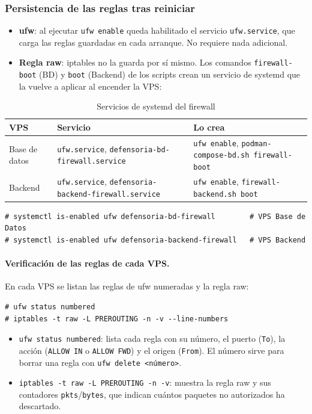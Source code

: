 \subsubsection{Persistencia de las reglas tras reiniciar}
\begin{itemize}
  \item \textbf{ufw}: al ejecutar \texttt{ufw enable} queda habilitado el servicio \texttt{ufw.service}, que carga las reglas guardadas en cada arranque. No requiere nada adicional.
  \item \textbf{Regla raw}: iptables no la guarda por sí mismo. Los comandos \texttt{firewall-boot} (BD) y \texttt{boot} (Backend) de los scripts crean un servicio de systemd que la vuelve a aplicar al encender la VPS:
\end{itemize}
\begin{table}[H]
\centering
\caption{Servicios de systemd del firewall}
\footnotesize
\begin{tabular}{p{2.2cm}p{5.6cm}p{6.4cm}}
\toprule
\textbf{VPS} & \textbf{Servicio} & \textbf{Lo crea} \\
\midrule
Base de datos & \texttt{ufw.service}, \texttt{defensoria-bd-firewall.service} & \texttt{ufw enable}, \texttt{podman-compose-bd.sh firewall-boot} \\
Backend & \texttt{ufw.service}, \texttt{defensoria-backend-firewall.service} & \texttt{ufw enable}, \texttt{firewall-backend.sh boot} \\
\bottomrule
\end{tabular}
\end{table}
\begin{lstlisting}
# systemctl is-enabled ufw defensoria-bd-firewall        # VPS Base de Datos
# systemctl is-enabled ufw defensoria-backend-firewall   # VPS Backend
\end{lstlisting}

\paragraph{Verificación de las reglas de cada VPS.} En cada VPS se listan las reglas de ufw numeradas y la regla raw:
\begin{lstlisting}
# ufw status numbered
# iptables -t raw -L PREROUTING -n -v --line-numbers
\end{lstlisting}
\begin{itemize}
  \item \texttt{ufw status numbered}: lista cada regla con su número, el puerto (\texttt{To}), la acción (\texttt{ALLOW IN} o \texttt{ALLOW FWD}) y el origen (\texttt{From}). El número sirve para borrar una regla con \texttt{ufw delete <número>}.
  \item \texttt{iptables -t raw -L PREROUTING -n -v}: muestra la regla raw y sus contadores \texttt{pkts}/\texttt{bytes}, que indican cuántos paquetes no autorizados ha descartado.
\end{itemize}
